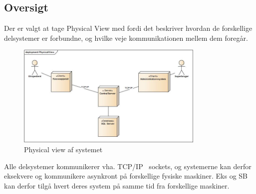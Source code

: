 \subsection{Oversigt}

Der er valgt at tage Physical View med fordi det beskriver hvordan de forskellige delsystemer er forbundne, og hvilke veje kommunikationen mellem dem foregår.

\begin{figure}[htb]
    \centering
    \includegraphics[width=0.8\textwidth]{Systemarkitektur/PhysicalView/Billeder/PhysicalView.jpg}
    \caption{Physical view af systemet}
    \label{fig:physicalview}
\end{figure}

Alle delsystemer kommunikerer vha. TCP/IP~\cite{TCPIP} sockets, og systemerne kan derfor eksekvere og kommunikere asynkront på forskellige fysiske maskiner. \gls{Eks} og \gls{SB} kan derfor tilgå hvert deres system på samme tid fra forskellige maskiner.